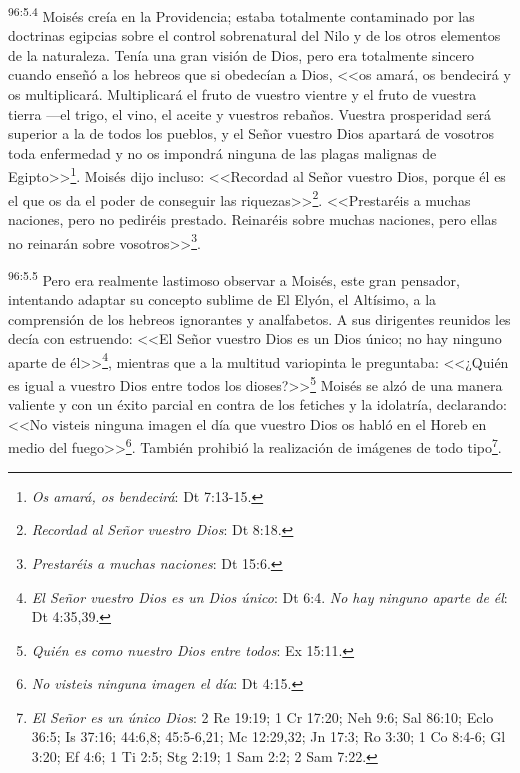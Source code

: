 \par
\textsuperscript{96:5.4} Moisés creía en la Providencia; estaba totalmente contaminado por las doctrinas egipcias sobre el control sobrenatural del Nilo y de los otros elementos de la naturaleza. Tenía una gran visión de Dios, pero era totalmente sincero cuando enseñó a los hebreos que si obedecían a Dios, <<os amará, os bendecirá y os multiplicará. Multiplicará el fruto de vuestro vientre y el fruto de vuestra tierra ---el trigo, el vino, el aceite y vuestros rebaños. Vuestra prosperidad será superior a la de todos los pueblos, y el Señor vuestro Dios apartará de vosotros toda enfermedad y no os impondrá ninguna de las plagas malignas de Egipto>>\footnote{\textit{Os amará, os bendecirá}: Dt 7:13-15.}. Moisés dijo incluso: <<Recordad al Señor vuestro Dios, porque él es el que os da el poder de conseguir las riquezas>>\footnote{\textit{Recordad al Señor vuestro Dios}: Dt 8:18.}. <<Prestaréis a muchas naciones, pero no pediréis prestado. Reinaréis sobre muchas naciones, pero ellas no reinarán sobre vosotros>>\footnote{\textit{Prestaréis a muchas naciones}: Dt 15:6.}.

\par
\textsuperscript{96:5.5} Pero era realmente lastimoso observar a Moisés, este gran pensador, intentando adaptar su concepto sublime de El Elyón, el Altísimo, a la comprensión de los hebreos ignorantes y analfabetos. A sus dirigentes reunidos les decía con estruendo: <<El Señor vuestro Dios es un Dios único; no hay ninguno aparte de él>>\footnote{\textit{El Señor vuestro Dios es un Dios único}: Dt 6:4. \textit{No hay ninguno aparte de él}: Dt 4:35,39.}, mientras que a la multitud variopinta le preguntaba: <<¿Quién es igual a vuestro Dios entre todos los dioses?>>\footnote{\textit{Quién es como nuestro Dios entre todos}: Ex 15:11.} Moisés se alzó de una manera valiente y con un éxito parcial en contra de los fetiches y la idolatría, declarando: <<No visteis ninguna imagen el día que vuestro Dios os habló en el Horeb en medio del fuego>>\footnote{\textit{No visteis ninguna imagen el día}: Dt 4:15.}. También prohibió la realización de imágenes de todo tipo\footnote{\textit{El Señor es un único Dios}: 2 Re 19:19; 1 Cr 17:20; Neh 9:6; Sal 86:10; Eclo 36:5; Is 37:16; 44:6,8; 45:5-6,21; Mc 12:29,32; Jn 17:3; Ro 3:30; 1 Co 8:4-6; Gl 3:20; Ef 4:6; 1 Ti 2:5; Stg 2:19; 1 Sam 2:2; 2 Sam 7:22.}.

